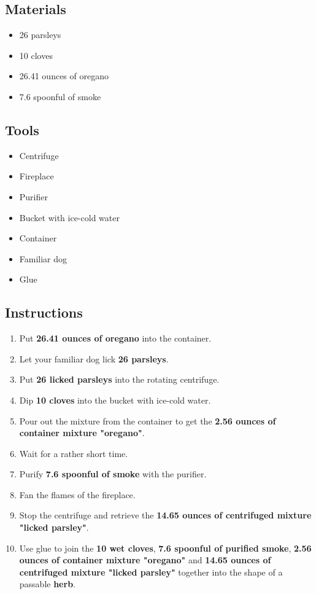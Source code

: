 \documentclass{article}
\begin{document}
\subsection{Materials}\begin{itemize}
\item 
26 parsleys
\item 
10 cloves
\item 
26.41 ounces of oregano
\item 
7.6 spoonful of smoke
\end{itemize}
\subsection{Tools}\begin{itemize}
\item 
Centrifuge
\item 
Fireplace
\item 
Purifier
\item 
Bucket with ice-cold water
\item 
Container
\item 
Familiar dog
\item 
Glue
\end{itemize}
\subsection{Instructions}\begin{enumerate}
\item 
Put \textbf{26.41 ounces of oregano} into the container.
\item 
Let your familiar dog lick \textbf{26 parsleys}.
\item 
Put \textbf{26 licked parsleys} into the rotating centrifuge.
\item 
Dip \textbf{10 cloves} into the bucket with ice-cold water.
\item 
Pour out the mixture from the container to get the \textbf{2.56 ounces of container mixture "oregano"}.
\item 
Wait for a rather short time.
\item 
Purify \textbf{7.6 spoonful of smoke} with the purifier.
\item 
Fan the flames of the fireplace.
\item 
Stop the centrifuge and retrieve the \textbf{14.65 ounces of centrifuged mixture "licked parsley"}.
\item 
Use glue to join the \textbf{10 wet cloves}, \textbf{7.6 spoonful of purified smoke}, \textbf{2.56 ounces of container mixture "oregano"} and \textbf{14.65 ounces of centrifuged mixture "licked parsley"} together into the shape of a passable \textbf{herb}.
\end{enumerate}
\newpage
\end{document}
